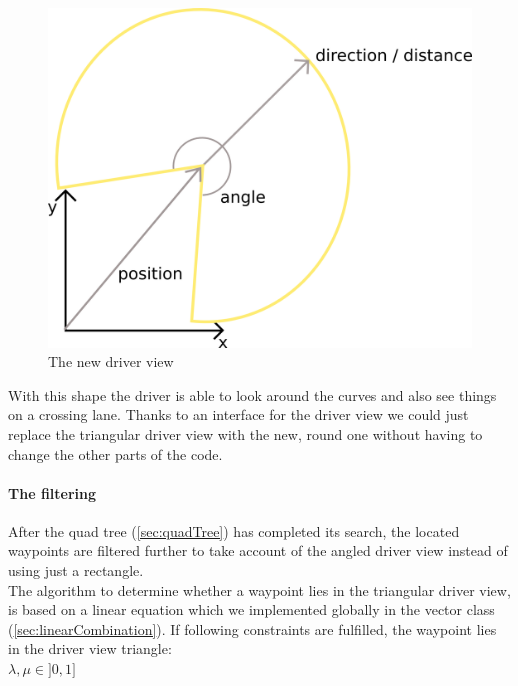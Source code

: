 \begin{figure}[H]
\begin{center}
\includegraphics[scale=0.4]{images/driverviewcircled.png}
\end{center}
\caption{The new driver view}
\label{fig:driverViewCircled}
\end{figure}

\noindent With this shape the driver is able to look around the curves
and also see things on a crossing lane. Thanks to an interface for the
driver view we could just replace the triangular driver view with the new,
round one without having to change the other parts of the code.

\paragraph{The filtering}

After the quad tree (\ref{sec:quadTree}) has completed its search, the
located waypoints are filtered further to take account of the angled
driver view instead of using just a rectangle. \\

The algorithm to determine whether a waypoint lies in the triangular
driver view, is based on a linear equation which we implemented globally
in the vector class (\ref{sec:linearCombination}). If following
constraints are fulfilled, the waypoint lies in the driver view
triangle: \\

$ \lambda, \mu \in ]0, 1]$ \\

